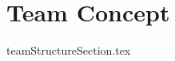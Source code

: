 \documentclass[class=book , crop=false]{standalone} %
\begin{document}
\chapter{Team Concept}

{teamStructureSection.tex}
\clearpage
\end{document}

